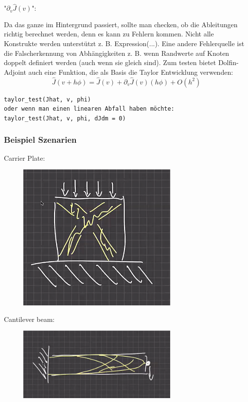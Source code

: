 \documentclass[a4paper, 12pt]{scrartcl}
\begin{document}
"$\partial_v \hat{J}(v)$":

Da das ganze im Hintergrund passiert, sollte man checken, ob die Ableitungen richtig berechnet werden, denn es kann zu Fehlern kommen. Nicht alle Konstrukte werden unterstützt z. B. Expression(...). Eine andere Fehlerquelle ist die Falscherkennung von Abhängigkeiten z. B. wenn Randwerte auf Knoten doppelt definiert werden (auch wenn sie gleich sind). Zum testen bietet Dolfin-Adjoint auch eine Funktion, die als Basis die Taylor Entwicklung verwenden: 
$$ \hat{J} (v + h \phi) =  \hat{J} (v) + \partial_v \hat{J} (v)(h \phi) + O(h^2)$$

\begin{lstlisting}
taylor_test(Jhat, v, phi)
oder wenn man einen linearen Abfall haben möchte:
taylor_test(Jhat, v, phi, dJdm = 0)
\end{lstlisting}
\subsubsection{Beispiel Szenarien}
Carrier Plate:
\begin{figure}[h]
\includegraphics[width=8cm]{graphics/carrierplatepic2.png}
\end{figure}

Cantilever beam:
\begin{figure}[h]
\includegraphics[width=8cm]{graphics/Cantipic.png}
\end{figure}
\end{document}
